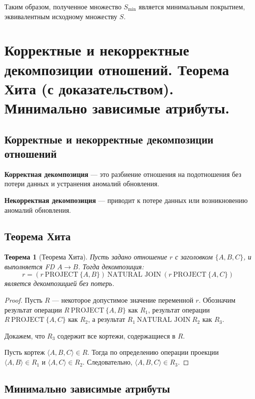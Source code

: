 \documentclass[a4paper,12pt]{article}
\newtheorem{theorem}{Теорема}
\begin{document}
Таким образом, полученное множество $S_{\text{min}}$ является минимальным покрытием, эквивалентным исходному множеству $S$.


\section{Корректные и некорректные декомпозиции отношений. Теорема Хита (с доказательством). Минимально зависимые атрибуты.}

\subsection{Корректные и некорректные декомпозиции отношений}

\textbf{Корректная декомпозиция} — это разбиение отношения на подотношения без потери данных и устранения аномалий обновления.

\textbf{Некорректная декомпозиция} — приводит к потере данных или возникновению аномалий обновления.

\subsection{Теорема Хита}

\begin{theorem}[Теорема Хита]
    Пусть задано отношение $r$ с заголовком $\{A, B, C\}$, и выполняется FD $A \rightarrow B$. Тогда декомпозиция:
    \[
    r = (r \ \text{PROJECT} \ \{A, B\}) \ \text{NATURAL JOIN} \ (r \ \text{PROJECT} \ \{A, C\})
    \]
    является декомпозицией без потерь.
\end{theorem}

\begin{proof}
    Пусть $R$ — некоторое допустимое значение переменной $r$. Обозначим результат операции $R \ \text{PROJECT} \ \{A, B\}$ как $R_1$, результат операции $R \ \text{PROJECT} \ \{A, C\}$ как $R_2$, а результат $R_1 \ \text{NATURAL JOIN} \ R_2$ как $R_3$.
    
    Докажем, что $R_3$ содержит все кортежи, содержащиеся в $R$.
    
    Пусть кортеж $\langle A, B, C \rangle \in R$. Тогда по определению операции проекции $\langle A, B \rangle \in R_1$ и $\langle A, C \rangle \in R_2$. Следовательно, $\langle A, B, C \rangle \in R_3$.
\end{proof}

\subsection{Минимально зависимые атрибуты}
\end{document}
